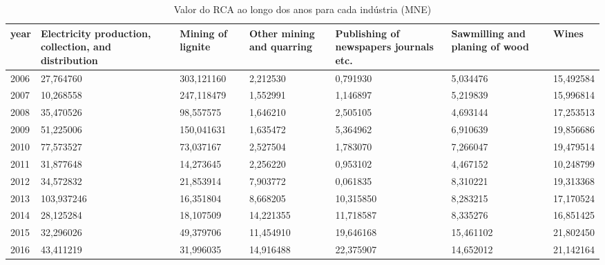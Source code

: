 \begin{table}
\centering
\caption{Valor do RCA ao longo dos anos para cada indústria (MNE)}
\begin{tabular}{p{1cm}p{2cm}p{2cm}p{2cm}p{2cm}p{2cm}p{2cm}}
\toprule
 year &  Electricity production, collection, and distribution &  Mining of lignite &  Other mining and quarring &  Publishing of newspapers journals etc. &  Sawmilling and planing of wood &     Wines \\
\midrule
 2006 &                                          27,764760 &         303,121160 &                   2,212530 &                                0,791930 &                        5,034476 & 15,492584 \\
 2007 &                                          10,268558 &         247,118479 &                   1,552991 &                                1,146897 &                        5,219839 & 15,996814 \\
 2008 &                                          35,470526 &          98,557575 &                   1,646210 &                                2,505105 &                        4,693144 & 17,253513 \\
 2009 &                                          51,225006 &         150,041631 &                   1,635472 &                                5,364962 &                        6,910639 & 19,856686 \\
 2010 &                                          77,573527 &          73,037167 &                   2,527504 &                                1,783070 &                        7,266047 & 19,479514 \\
 2011 &                                          31,877648 &          14,273645 &                   2,256220 &                                0,953102 &                        4,467152 & 10,248799 \\
 2012 &                                          34,572832 &          21,853914 &                   7,903772 &                                0,061835 &                        8,310221 & 19,313368 \\
 2013 &                                         103,937246 &          16,351804 &                   8,668205 &                               10,315850 &                        8,283215 & 17,170524 \\
 2014 &                                          28,125284 &          18,107509 &                  14,221355 &                               11,718587 &                        8,335276 & 16,851425 \\
 2015 &                                          32,296026 &          49,379706 &                  11,454910 &                               19,646168 &                       15,461102 & 21,802450 \\
 2016 &                                          43,411219 &          31,996035 &                  14,916488 &                               22,375907 &                       14,652012 & 21,142164 \\
\bottomrule
\end{tabular}
\end{table}
